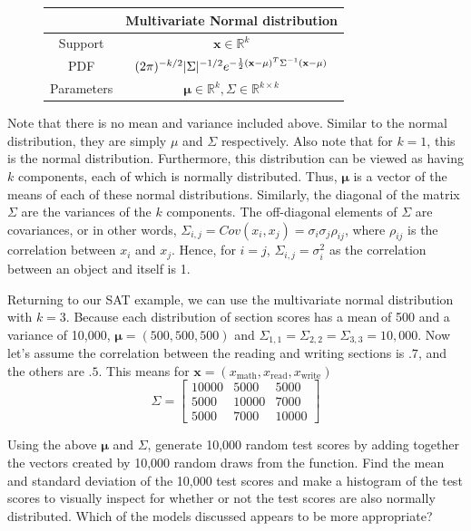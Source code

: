\begin{figure}[h]
\begin{center}
\begin{tabular}{|c|c|}
\hline
&Multivariate Normal distribution  \\ \hline \hline
Support &$\mathbf{x} \in \mathbb{R}^k$ \\ \hline
PDF & $(2\pi)^{-k/2}|\Sigma|^{-1/2}e^{-\frac{1}{2}(\mathbf{x} - \mathbf\mathbf{\mu})^T \Sigma^{-1} (\mathbf{x}-\mathbf{\mu})}$ \\ \hline
 Parameters&$\mathbf{\mu}\in \mathbb{R}^k, \Sigma \in \mathbb{R}^{k\times k}$ \\ \hline
\end{tabular}
\end{center}
\end{figure}
Note that there is no mean and variance included above. 
Similar to the normal distribution, they are simply $\mu$ and $\Sigma$ respectively. Also note that for $k=1$, this is the normal distribution.  
Furthermore, this distribution can be viewed as having $k$ components, each of which is normally distributed. 
Thus, $\mathbf{\mu}$ is a vector of the means of each of these normal distributions. 
Similarly, the diagonal of the matrix $\Sigma$ are the variances of the $k$ components. 
The off-diagonal elements of $\Sigma$ are covariances, or in other words, $\Sigma_{i,j} = Cov(x_i,x_j) = \sigma_i \sigma_j \rho_{ij}$, where $\rho_{ij}$ is the correlation between $x_i$ and $x_j$. 
Hence, for $i=j$, $\Sigma_{i,j} = \sigma^2_i$ as the correlation between an object and itself is 1. 

Returning to our SAT example, we can use the multivariate normal distribution with $k=3$. 
Because each distribution of section scores has a mean of 500 and a variance of 10,000, $\mathbf{\mu} = (500,500,500)$ and $\Sigma_{1,1} = \Sigma_{2,2} = \Sigma_{3,3} = 10,000$. 
Now let's assume the correlation between the reading and writing sections is $.7$, and the others are $.5$. 
This means for $\mathbf{x} = (x_{\text{math}},x_{\text{read}},x_{\text{write}})$
\[ \Sigma =  \begin{bmatrix*}
10000 & 5000 & 5000 \\
5000 & 10000 & 7000 \\
5000 & 7000 & 10000 \end{bmatrix*} \]  

\begin{problem}
Using the above $\mathbf{\mu}$ and $\Sigma$, generate 10,000 random test scores by adding together the vectors created by 10,000 random draws from the 
 function. 
Find the mean and standard deviation of the 10,000 test scores and make a histogram of the test scores to visually 
inspect for whether or not the test scores are also normally distributed. 
Which of the models discussed appears to be more appropriate?
\end{problem}

